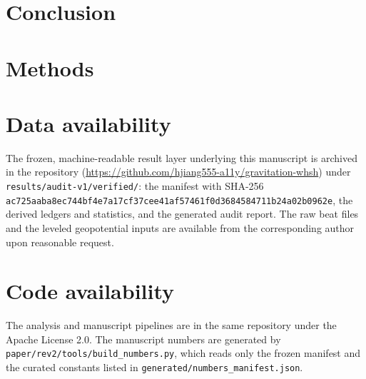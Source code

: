 \documentclass[11pt,a4paper]{article}
\begin{document}
\section*{Conclusion}
\label{sec:conclusion}





\section*{Methods}


\section*{Data availability}
The frozen, machine-readable result layer underlying this manuscript is
archived in the repository
(\url{https://github.com/hjiang555-a11y/gravitation-whsh}) under
\texttt{results/audit-v1/verified/}: the manifest with SHA-256
\texttt{ac725aaba8ec744bf4e7a17cf37cee41af57461f0d3684584711b24a02b0962e},
the derived ledgers and statistics, and the generated audit report. The
raw beat files and the leveled geopotential inputs are available from
the corresponding author upon reasonable request.

\section*{Code availability}
The analysis and manuscript pipelines are in the same repository under the
Apache License 2.0. The manuscript numbers are generated by
\texttt{paper/rev2/tools/build\_numbers.py}, which reads only the frozen
manifest and the curated constants listed in
\texttt{generated/numbers\_manifest.json}.
\end{document}

